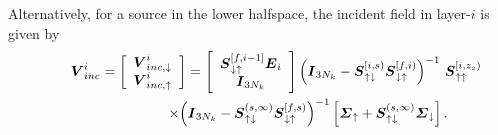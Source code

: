  Alternatively, for a source in the lower halfspace, the incident field in layer-$i$ is 
 given by 
\begin{eqnarray} \label{incup}
\lefteqn{
{\bmi  V}_{{inc}}^{ i}=\left[{\begin{array}{c}{\bmi  V}_{{inc},\downarrow}^{ 
i}\\ {\bmi  V}_{{inc},\uparrow}^{ i}\end{array}}\right]
=\left[{\begin{array}{c}
{\bmi S}{}_{\downarrow\uparrow }^{   [f,{i-1}]}{{\bmi E}}_{i}\\ 
{\bmi  I}_{3 N_k}\end{array}}\right] 
{\left({\bmi  I}_{ 3 N_k}-
{\bmi S}{}_{\uparrow\downarrow }^{ [i,{s})} {\bmi S}{}_{\downarrow\uparrow 
}^{ 
[f,i)}\right)}^{-1}\
 {\bmi S}{}_{\uparrow\uparrow }^{ [i,z_{s})}
}\nonumber\\
&&\qquad \qquad \qquad \times
{\left({{\bmi  I}_{3 N_k}-{\bmi S}{}_{\uparrow\downarrow }^{ ({s},\infty)}
{{\bmi S}}{}_{\downarrow\uparrow }^{ [f,{s})}}\right)}^{-1}
\left[ {\bmi \Sigma}_{\uparrow} +
{\bmi S}{}_{\uparrow\downarrow }^{({s}, \infty)} {\bmi \Sigma}_{\downarrow}
\right].
\end{eqnarray}






